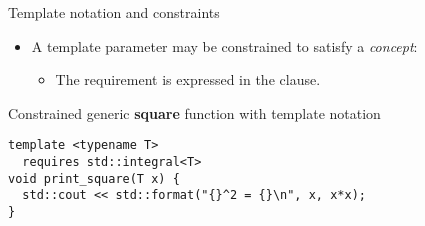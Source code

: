 \begin{frame}[t,fragile]{Template notation and constraints}

\begin{itemize}
  \item A template parameter may be constrained to satisfy a \emph{concept}:
    \begin{itemize}
      \item The requirement is expressed in the  clause.
    \end{itemize}
\end{itemize}

\begin{block}{Constrained generic \textbf{square} function with template notation}
\begin{lstlisting}
template <typename T>
  requires std::integral<T>
void print_square(T x) {
  std::cout << std::format("{}^2 = {}\n", x, x*x);
}
\end{lstlisting}
\end{block}

\end{frame}
